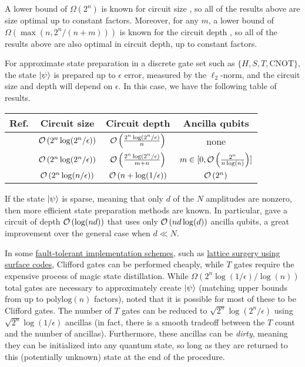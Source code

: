 \begin{refsection}
A lower bound of $\Omega(2^n)$ is known for circuit size \cite{plesch2011statePrepUniversal}, so all of the results above are size optimal up to constant factors. Moreover, for any $m$, a lower bound of $\Omega(\max(n,2^n/(n+m)))$ is known for the circuit depth \cite{sun2021asymptotically}, so all of the results above are also optimal in circuit depth, up to constant factors. 

For approximate state preparation in a discrete gate set such as $\{H,S,T,\mathrm{CNOT}\}$, the state $\lvert\psi\rangle$ is prepared up to $\epsilon$ error, measured by the $\ell_2$-norm, and the circuit size and depth will depend on $\epsilon$. In this case, we have the following table of results. 

\begin{table}[!ht]
\renewcommand{\arraystretch}{1.2}
\centering
\begin{tabular}{c|c|c|c}
\textbf{Ref.} & \textbf{Circuit size} & \textbf{Circuit depth} & \textbf{Ancilla qubits} \\
\hline
\hline
\cite{sun2021asymptotically} & $\mathcal{O}\left( 2^n \log(2^n/\epsilon) \right)$ & $\mathcal{O}\left( \frac{2^n \log(2^n/\epsilon)}{n} \right)$ & none \\
\hline
\cite{sun2021asymptotically}  & $\mathcal{O}\left( 2^n \log(2^n/\epsilon) \right)$ & $\mathcal{O}\left( \frac{2^n\log(2^n/\epsilon)}{m+n} \right)$ & $m \in [0,\mathcal{O}\left( \frac{2^n}{n \log(n)} \right)]$ \\
\hline
\cite{gui2023spacetime} & $\mathcal{O}\left( 2^n\log(n/\epsilon) \right)$ & $\mathcal{O}\left( n +\log(1/\epsilon) \right)$ & $\mathcal{O}\left( 2^n \right)$ \\
\end{tabular}
\end{table}

If the state $\lvert\psi\rangle$ is sparse, meaning that only $d$ of the $N$ amplitudes are nonzero, then more efficient state preparation methods are known. In particular, \cite{zhang2022StatePrepOptimal} gave a circuit of depth $\mathcal{O}\left( \log(nd) \right)$ that uses only $\mathcal{O}\left( nd\log(d) \right)$ ancilla qubits, a great improvement over the general case when $d \ll N$. 

In some \hyperref[prim:FaultTolerance]{fault-tolerant implementation schemes}, such as \hyperref[prim:LatticeSurgery]{lattice surgery using surface codes}, Clifford gates can be performed cheaply, while $T$ gates require the expensive process of magic state distillation. While $\Omega(2^n\log(1/\epsilon)/\log(n))$ total gates are necessary to approximately create $\lvert\psi\rangle$ \cite[Eq.~4.85]{nielsen2002QCQI} (matching upper bounds from \cite{gui2023spacetime} up to $\mathrm{polylog}(n)$ factors), \cite{low2018tradingTgatesforDirtyQubits} noted that it is possible for most of these to be Clifford gates. The number of $T$ gates can be reduced to $\sqrt{2^n}\log(2^n/\epsilon)$ using $\sqrt{2^n}\log(1/\epsilon)$ ancillas (in fact, there is a smooth tradeoff between the $T$ count and the number of ancillas). Furthermore, these ancillas can be \textit{dirty}, meaning they can be initialized into any quantum state, so long as they are returned to this (potentially unknown) state at the end of the procedure.


\end{refsection}
